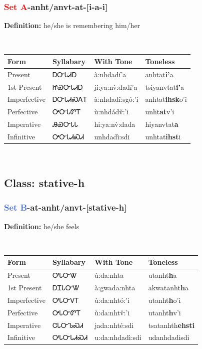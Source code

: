 \subsubsection*{\textcolor{Red}{Set A}{-}\textbf{anht/anvt}{-}at{-}[i-a-i]}
\nopagebreak
\textbf{Definition: } he/she is remembering him/her
\\[0.5em]
\begin{tabularx}{\textwidth}{l X X X}%
\toprule%
\textbf{Form}&\textbf{Syllabary}&\textbf{With Tone}&\textbf{Toneless}\\%
\midrule%
Present&ᎠᏅᏓᏗᎠ&à:nhdadí’a&anhtat\textbf{i'}a\\%
1st Present&ᏥᏯᏅᏓᏗᎠ&ji:ya:nv̀:dadí’a&tsiyanvtat\textbf{i'}a\\%
Imperfective&ᎠᏅᏓᏗᏍᎪᎢ&à:nhdadî:sgó:’i&anhtat\textbf{ihsk}o'i\\%
Perfective&ᎤᏅᏓᏛᎢ&ù:nhdádv̌:’i&unht\textbf{at}v'i\\%
Imperative&ᎯᏯᏅᏓᏓ&hi:ya:nv̀:dada&hiyanvtat\textbf{a}\\%
Infinitive&ᎤᏅᏓᏗᏍᏗ&unhdadì:sdi&unhtat\textbf{ihst}i\\%
\bottomrule%
\end{tabularx}
\\[1em]
\needspace{3in}
\subsection*{Class: stative-h}
\nopagebreak
\needspace{2in}
\subsubsection*{\textcolor{RoyalBlue}{Set B}{-}at{-}\textbf{anht/anvt}{-}[stative-h]}
\nopagebreak
\textbf{Definition: } he/she feels
\\[0.5em]
\begin{tabularx}{\textwidth}{l X X X}%
\toprule%
\textbf{Form}&\textbf{Syllabary}&\textbf{With Tone}&\textbf{Toneless}\\%
\midrule%
Present&ᎤᏓᏅᏔ&ù:da:nhta&utanht\textbf{h}a\\%
1st Present&ᎠᏆᏓᏅᏔ&à:gwada:nhta&akwatanht\textbf{h}a\\%
Imperfective&ᎤᏓᏅᏙᎢ&ù:da:nhtó:’i&utanht\textbf{h}o'i\\%
Perfective&ᎤᏓᏅᏛᎢ&ù:da:nhtv̌:’i&utanht\textbf{h}v'i\\%
Imperative&ᏣᏓᏅᏖᏍᏗ&jada:nhté:sdi&tsatanhth\textbf{ehsti}\\%
Infinitive&ᎤᏓᏅᏓᏗᏍᏗ&u:da:nhdadì:sdi&udanhdadisdi\\%
\bottomrule%
\end{tabularx}
\\[1em]
\needspace{2in}
